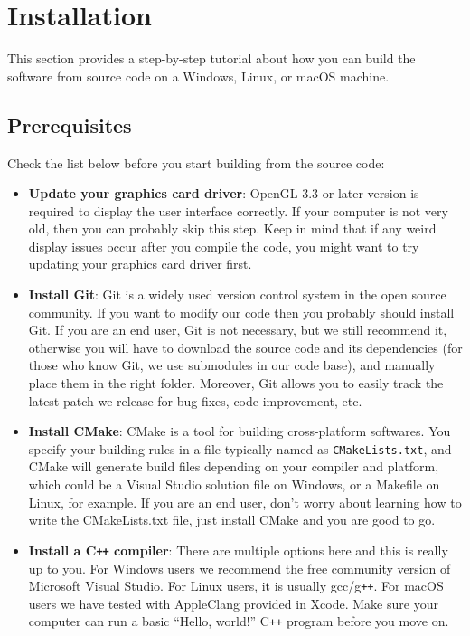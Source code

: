 \clearpage
\section{Installation}\label{sec:install}
This section provides a step-by-step tutorial about how you can build the software from source code on a Windows, Linux, or macOS machine. 

\subsection{Prerequisites}
Check the list below before you start building from the source code:
\begin{itemize}
\item \textbf{Update your graphics card driver}: OpenGL 3.3 or later version is required to display the user interface correctly. If your computer is not very old, then you can probably skip this step. Keep in mind that if any weird display issues occur after you compile the code, you might want to try updating your graphics card driver first.

\item \textbf{Install Git}: Git is a widely used version control system in the open source community. If you want to modify our code then you probably should install Git. If you are an end user, Git is not necessary, but we still recommend it, otherwise you will have to download the source code and its dependencies (for those who know Git, we use submodules in our code base), and manually place them in the right folder. Moreover, Git allows you to easily track the latest patch we release for bug fixes, code improvement, etc.

\item \textbf{Install CMake}: CMake is a tool for building cross-platform softwares. You specify your building rules in a file typically named as \texttt{CMakeLists.txt}, and CMake will generate build files depending on your compiler and platform, which could be a Visual Studio solution file on Windows, or a Makefile on Linux, for example. If you are an end user, don't worry about learning how to write the CMakeLists.txt file, just install CMake and you are good to go.

\item \textbf{Install a C\texttt{++} compiler}: There are multiple options here and this is really up to you. For Windows users we recommend the free community version of Microsoft Visual Studio. For Linux users, it is usually gcc/g\texttt{++}. For macOS users we have tested with AppleClang provided in Xcode. Make sure your computer can run a basic ``Hello, world!'' C\texttt{++} program before you move on.
\end{itemize}

